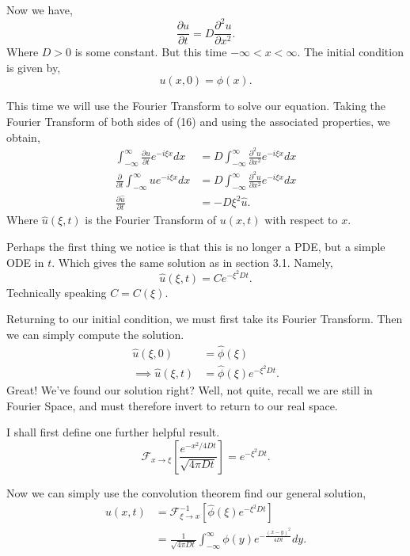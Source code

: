 \documentclass[11pt]{article}
\begin{document}
Now we have,
\begin{equation}
    \frac{\partial u}{\partial t} = D \frac{\partial^2 u}{\partial x^2}.
\end{equation}
Where $D>0$ is some constant. But this time $ -\infty < x < \infty$. The initial condition is given by,
\begin{equation}
    u(x,0) = \phi(x).
\end{equation}

This time we will use the Fourier Transform to solve our equation. Taking the Fourier Transform of both sides of (16) and using the associated properties, we obtain,
\begin{align}
    \int_{-\infty}^{\infty} \frac{\partial u}{\partial t} e^{-i \xi x} dx &= D \int_{-\infty}^{\infty} \frac{\partial^2 u}{\partial x^2} e^{-i \xi x} dx \\
    \frac{\partial}{\partial t} \int_{-\infty}^{\infty}  u e^{-i \xi x} dx &= D \int_{-\infty}^{\infty} \frac{\partial^2 u}{\partial x^2} e^{-i \xi x} dx \\
    \frac{\partial \hat{u}}{\partial t} &= -D \xi^2 \hat{u}.
\end{align}
Where $\hat{u}(\xi,t)$ is the Fourier Transform of $u(x,t)$ with respect to $x$. 

\newpage

Perhaps the first thing we notice is that this is no longer a PDE, but a simple ODE in $t$. Which gives the same solution as in section 3.1. Namely,
\begin{equation}
        \hat{u}(\xi,t) = Ce^{-\xi^2 Dt}.
\end{equation}
Technically speaking $C = C(\xi)$.

Returning to our initial condition, we must first take its Fourier Transform. Then we can simply compute the solution.
\begin{align}
    \hat{u}(\xi,0) &= \hat{\phi}(\xi) \\
    \implies \hat{u}(\xi, t) &= \hat{\phi}(\xi) e^{-\xi^2 Dt}.
\end{align}
Great! We've found our solution right? Well, not quite, recall we are still in Fourier Space, and must therefore invert to return to our real space.

I shall first define one further helpful result.
\begin{equation}
    \mathcal{F}_{x \rightarrow \xi} \left[ \frac{e^{-x^2/4Dt}}{\sqrt{4 \pi Dt}} \right] = e^{-\xi^2 Dt}.
\end{equation}

Now we can simply use the convolution theorem find our general solution,
\begin{align}
    u(x,t) &= \mathcal{F}_{\xi \rightarrow x}^{-1} \left[ \hat{\phi}(\xi) e^{-\xi^2 Dt} \right] \\
    &= \frac{1}{\sqrt{4 \pi Dt}} \int_{-\infty}^{\infty} \phi(y) e^{-\frac{(x-y)^2}{4Dt}} dy.
\end{align}
\end{document}
